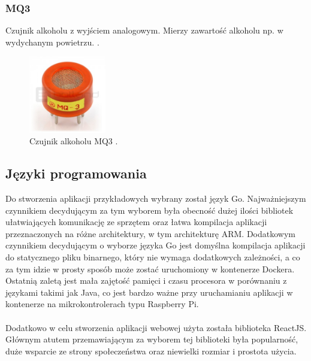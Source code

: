 \documentclass[12pt]{report}
\let\Oldsubsection\subsection
\renewcommand{\subsection}{\FloatBarrier\Oldsubsection}
\let\Oldsubsubsection\subsubsection
\renewcommand{\subsubsection}{\FloatBarrier\Oldsubsubsection}
\begin{document}
{\subsubsection{MQ3}
Czujnik alkoholu z wyjściem analogowym. Mierzy zawartość alkoholu np. w wydychanym powietrzu. \cite{mq3Botland}. %
\begin{figure}[h]
	\centering
	\includegraphics[width=0.3\textwidth]{images/mq3.jpg}
	\caption{Czujnik alkoholu MQ3 \cite{mq3Img}.}
\end{figure}
\subsection{Języki programowania}
Do stworzenia aplikacji przykładowych wybrany został język Go. Najważniejszym czynnikiem decydującym za tym wyborem była obecność dużej ilości bibliotek ułatwiających komunikację ze sprzętem oraz łatwa kompilacja aplikacji przeznaczonych na różne architektury, w tym architekturę ARM. Dodatkowym czynnikiem decydującym o wyborze języka Go jest domyślna kompilacja aplikacji do statycznego pliku binarnego, który nie wymaga dodatkowych zależności, a co za tym idzie w prosty sposób może zostać uruchomiony w kontenerze Dockera. Ostatnią zaletą jest mała zajętość pamięci i czasu procesora w porównaniu z językami takimi jak Java, co jest bardzo ważne przy uruchamianiu aplikacji w kontenerze na mikrokontrolerach typu Raspberry Pi.\\ \\
Dodatkowo w celu stworzenia aplikacji webowej użyta została biblioteka ReactJS. Głównym atutem przemawiającym za wyborem tej biblioteki była popularność, duże wsparcie ze strony społeczeństwa oraz niewielki rozmiar i prostota użycia.

}
\end{document}
